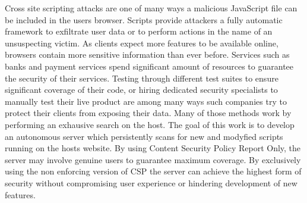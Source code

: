 Cross site scripting attacks are one of many ways a malicious JavaScript file can be included in the users browser. 
Scripts provide attackers a fully automatic framework to exfiltrate user data or to perform actions in the name of an unsuspecting victim.
As clients expect more features to be available online, browsers contain more sensitive information than ever before.
Services such as banks and payment services spend significant amount of resources to guarantee the security of their services.
Testing through different test suites to ensure significant coverage of their code, or hiring dedicated security specialists to manually test their live product are among many ways such companies try to protect their clients from exposing their data.
Many of those methods work by performing an exhausive search on the host. 
The goal of this work is to develop an autonomous server which persistently scans for new and modyfied scripts running on the hosts website.
By using Content Security Policy Report Only, the server may involve genuine users to guarantee maximum coverage.
By exclusively using the non enforcing version of CSP the server can achieve the highest form of security without compromising user experience or hindering development of new features.


